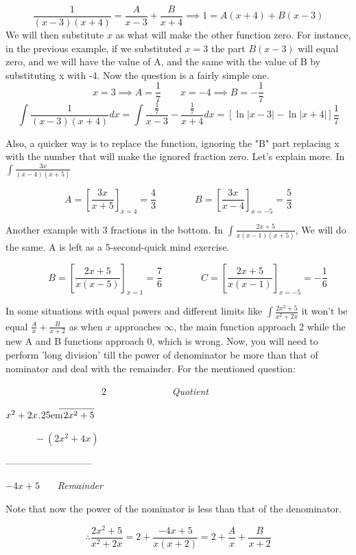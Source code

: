 \documentclass{article}
\newcommand\longdiv[2]{%
	$\strut#1$\kern.25em\smash{\raise.3ex\hbox{$\big)$}}$\mkern-8mu
	\overline{\enspace\strut#2}$}
\begin{document}
	\[
		\frac{1}{(x-3)(x+4)} = \frac{A}{x-3} + \frac{B}{x+4} \implies 1=A(x+4)+B(x-3)
	\]
	We will then substitute $ x $ as what will make the other function zero. For instance, in the previous example, if we substituted $ x = 3 $ the part $ B(x-3) $ will equal zero, and we will have the value of A, and the same with the value of B by substituting x with -4. 
	Now the question is a fairly simple one.
	\[
		x=3 \implies A = \frac{1}{7} \qquad x=-4 \implies B =-\frac{1}{7}
	\]
	\[
		\int \frac{1}{(x-3)(x+4)} dx = \int \frac{ \frac{1}{7} }{ x-3 } - \frac{ \frac{1}{7} }{ x+4 } dx
		=[ \ln{|x-3|} - \ln{|x+4|} ] \frac{1}{7}
	\]

	Also, a quicker way is to replace the function, ignoring the "B" part replacing x with the number that will make the ignored fraction zero. Let's explain more.
	In $\int \frac{3x}{(x-4)(x+5)} $

	\[
		A = \left [ \frac{3x}{x+5} \right ]  _{x=4}
		= \frac{4}{3} \qquad \qquad B = \left [ \frac{3x}{x-4} \right ] _{x=-5} = \frac{5}{3}
	\]

	Another example with 3 fractions in the bottom. In $\int \frac{ 2x+5 }{ x(x-1)(x+5) }$, We will do the same. A is left as a 5-second-quick mind exercise.

	\[
		\qquad B = \left [ \frac{ 2x+5 }{ x(x-5) }    \right ]_{x=1} = \frac{7}{6} \qquad \qquad C = \left [ \frac{ 2x+5 }{ x(x-1) }   \right ]_{x=-5} = -\frac{1}{6} 
	\]

	In some situations with equal powers and different limits like $ \int \frac{ 2x^2+5 }{ x^2+2x }  $ it won't be equal $ \frac{A}{x} + \frac{B}{x+2} $ as when $ x $ approaches $ \infty $, the main function approach 2 while the new A and B functions approach 0, which is wrong. Now, you will need to perform 'long division' till the power of denominator be more than that of nominator and deal with the remainder. For the mentioned question: 
	\begin{center}

		$ \qquad \qquad \qquad \qquad  \qquad  2 $ \ \ \ \ \ \ \ \ \ \ \ \ \ \it{Quotient} \

		\longdiv{x^2+2x}{2x^2+5}

		$ \qquad  \quad -(2x^2+4x) $

		---------------------------

		\qquad \qquad \qquad \qquad \qquad 	$ -4x+5  $ \ \ \ \it{Remainder}

		Note that now the power of the nominator is less than that of the denominator.

		\[	
		\therefore \frac{ 2x^2 + 5 }{x^2+2x} =  2 + \frac{ -4x+5 }{ x(x+2) }
		= 2 + \frac{A}{x} + \frac{ B }{ x+2 } 
		\] 

	\end{center}
\end{document}
